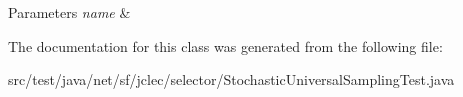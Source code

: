 \begin{DoxyParams}{Parameters}
{\em name} & \\
\hline
\end{DoxyParams}


The documentation for this class was generated from the following file\-:\begin{DoxyCompactItemize}
\item 
src/test/java/net/sf/jclec/selector/Stochastic\-Universal\-Sampling\-Test.\-java\end{DoxyCompactItemize}
